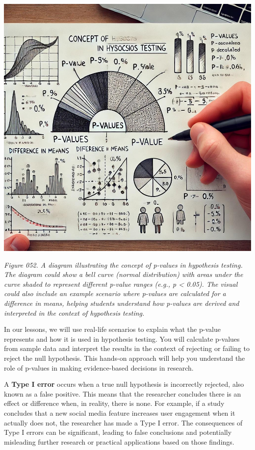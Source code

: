 \documentclass[
]{book}
\begin{document}
\includegraphics[width=1\textwidth,height=\textheight]{images/fig052.jpg}

\emph{Figure 052. A diagram illustrating the concept of p-values in hypothesis testing. The diagram could show a bell curve (normal distribution) with areas under the curve shaded to represent different p-value ranges (e.g., p \textless{} 0.05). The visual could also include an example scenario where p-values are calculated for a difference in means, helping students understand how p-values are derived and interpreted in the context of hypothesis testing.}

In our lessons, we will use real-life scenarios to explain what the p-value represents and how it is used in hypothesis testing. You will calculate p-values from sample data and interpret the results in the context of rejecting or failing to reject the null hypothesis. This hands-on approach will help you understand the role of p-values in making evidence-based decisions in research.

A \textbf{Type I error} occurs when a true null hypothesis is incorrectly rejected, also known as a false positive. This means that the researcher concludes there is an effect or difference when, in reality, there is none. For example, if a study concludes that a new social media feature increases user engagement when it actually does not, the researcher has made a Type I error. The consequences of Type I errors can be significant, leading to false conclusions and potentially misleading further research or practical applications based on those findings.
\end{document}
